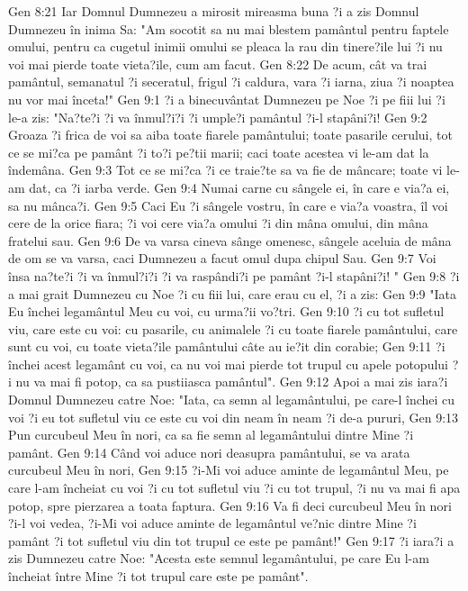 Gen 8:21  Iar Domnul Dumnezeu a mirosit mireasma buna ?i a zis Domnul Dumnezeu în inima Sa: "Am socotit sa nu mai blestem pamântul pentru faptele omului, pentru ca cugetul inimii omului se pleaca la rau din tinere?ile lui ?i nu voi mai pierde toate vieta?ile, cum am facut.
Gen 8:22  De acum, cât va trai pamântul, semanatul ?i seceratul, frigul ?i caldura, vara ?i iarna, ziua ?i noaptea nu vor mai înceta!"
Gen 9:1  ?i a binecuvântat Dumnezeu pe Noe ?i pe fiii lui ?i le-a zis: "Na?te?i ?i va înmul?i?i ?i umple?i pamântul ?i-l stapâni?i!
Gen 9:2  Groaza ?i frica de voi sa aiba toate fiarele pamântului; toate pasarile cerului, tot ce se mi?ca pe pamânt ?i to?i pe?tii marii; caci toate acestea vi le-am dat la îndemâna.
Gen 9:3  Tot ce se mi?ca ?i ce traie?te sa va fie de mâncare; toate vi le-am dat, ca ?i iarba verde.
Gen 9:4  Numai carne cu sângele ei, în care e via?a ei, sa nu mânca?i.
Gen 9:5  Caci Eu ?i sângele vostru, în care e via?a voastra, îl voi cere de la orice fiara; ?i voi cere via?a omului ?i din mâna omului, din mâna fratelui sau.
Gen 9:6  De va varsa cineva sânge omenesc, sângele aceluia de mâna de om se va varsa, caci Dumnezeu a facut omul dupa chipul Sau.
Gen 9:7  Voi însa na?te?i ?i va înmul?i?i ?i va raspândi?i pe pamânt ?i-l stapâni?i! "
Gen 9:8  ?i a mai grait Dumnezeu cu Noe ?i cu fiii lui, care erau cu el, ?i a zis:
Gen 9:9  "Iata Eu închei legamântul Meu cu voi, cu urma?ii vo?tri.
Gen 9:10  ?i cu tot sufletul viu, care este cu voi: cu pasarile, cu animalele ?i cu toate fiarele pamântului, care sunt cu voi, cu toate vieta?ile pamântului câte au ie?it din corabie;
Gen 9:11  ?i închei acest legamânt cu voi, ca nu voi mai pierde tot trupul cu apele potopului ?i nu va mai fi potop, ca sa pustiiasca pamântul".
Gen 9:12  Apoi a mai zis iara?i Domnul Dumnezeu catre Noe: "Iata, ca semn al legamântului, pe care-l închei cu voi ?i eu tot sufletul viu ce este cu voi din neam în neam ?i de-a pururi,
Gen 9:13  Pun curcubeul Meu în nori, ca sa fie semn al legamântului dintre Mine ?i pamânt.
Gen 9:14  Când voi aduce nori deasupra pamântului, se va arata curcubeul Meu în nori,
Gen 9:15  ?i-Mi voi aduce aminte de legamântul Meu, pe care l-am încheiat cu voi ?i cu tot sufletul viu ?i cu tot trupul, ?i nu va mai fi apa potop, spre pierzarea a toata faptura.
Gen 9:16  Va fi deci curcubeul Meu în nori ?i-l voi vedea, ?i-Mi voi aduce aminte de legamântul ve?nic dintre Mine ?i pamânt ?i tot sufletul viu din tot trupul ce este pe pamânt!"
Gen 9:17  ?i iara?i a zis Dumnezeu catre Noe: "Acesta este semnul legamântului, pe care Eu l-am încheiat între Mine ?i tot trupul care este pe pamânt".
